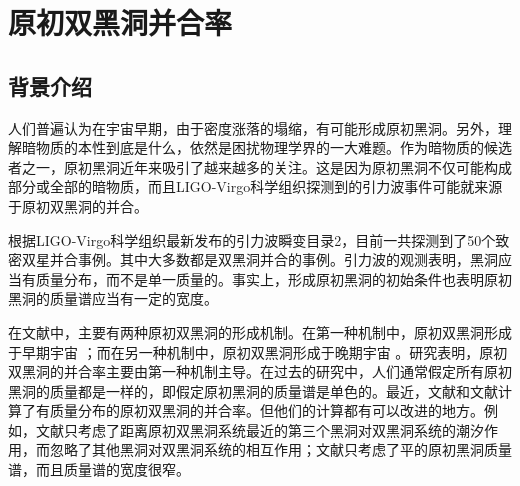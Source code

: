 \chapter{原初双黑洞并合率}\label{chap:mergerrate}

\section{背景介绍}


人们普遍认为在宇宙早期，由于密度涨落的塌缩，有可能形成原初黑洞\cite{Hawking:1971ei,Carr:1974nx,Carr:1975qj}。另外，理解暗物质的本性到底是什么，依然是困扰物理学界的一大难题。作为暗物质的候选者之一，原初黑洞近年来吸引了越来越多的关注。这是因为原初黑洞不仅可能构成部分或全部的暗物质，而且LIGO-Virgo科学组织探测到的引力波事件\cite{Abbott:2016blz}可能就来源于原初双黑洞的并合\cite{Sasaki:2016jop,Bird:2016dcv}。

根据LIGO-Virgo科学组织最新发布的引力波瞬变目录2\cite{Abbott:2020niy}，目前一共探测到了50个致密双星并合事例。其中大多数都是双黑洞并合的事例。引力波的观测表明，黑洞应当有质量分布，而不是单一质量的。事实上，形成原初黑洞的初始条件也表明原初黑洞的质量谱应当有一定的宽度。

在文献中，主要有两种原初双黑洞的形成机制。在第一种机制中，原初双黑洞形成于早期宇宙 \cite{Sasaki:2016jop,Nakamura:1997sm,Ali-Haimoud:2017rtz}；而在另一种机制中，原初双黑洞形成于晚期宇宙 \cite{Bird:2016dcv,Ali-Haimoud:2017rtz,Nishikawa:2017chy}。研究表明，原初双黑洞的并合率主要由第一种机制主导。在过去的研究中，人们通常假定所有原初黑洞的质量都是一样的，即假定原初黑洞的质量谱是单色的\cite{Sasaki:2016jop,Nakamura:1997sm,Ali-Haimoud:2017rtz,Bird:2016dcv,Nishikawa:2017chy}。最近，文献\cite{Raidal:2017mfl}和文献\cite{Kocsis:2017yty}计算了有质量分布的原初双黑洞的并合率。但他们的计算都有可以改进的地方。例如，文献\cite{Raidal:2017mfl}只考虑了距离原初双黑洞系统最近的第三个黑洞对双黑洞系统的潮汐作用，而忽略了其他黑洞对双黑洞系统的相互作用；文献\cite{Kocsis:2017yty}只考虑了平的原初黑洞质量谱，而且质量谱的宽度很窄。

